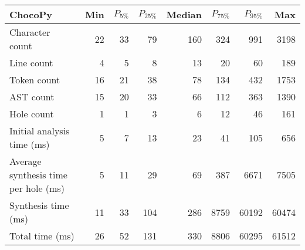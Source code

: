 \begin{tabular}{|l|r|r|r|r|r|r|r|}
  \hline
  ChocoPy & Min & $P_{5\%}$ & $P_{25\%}$ & Median & $P_{75\%}$ & $P_{95\%}$ & Max \\
  \hline
  \hline
  Character count & 22 & 33 & 79 & 160 & 324 & 991 & 3198 \\
  Line count & 4 & 5 & 8 & 13 & 20 & 60 & 189 \\
  Token count & 16 & 21 & 38 & 78 & 134 & 432 & 1753 \\
  AST count & 15 & 20 & 33 & 66 & 112 & 363 & 1390 \\
  Hole count & 1 & 1 & 3 & 6 & 12 & 46 & 161 \\
  \hline
  Initial analysis time (ms) & 5 & 7 & 13 & 23 & 41 & 105 & 656 \\
  Average synthesis time per hole (ms) & 5 & 11 & 29 & 69 & 387 & 6671 & 7505 \\
  Synthesis time (ms) & 11 & 33 & 104 & 286 & 8759 & 60192 & 60474 \\
  Total time (ms) & 26 & 52 & 131 & 330 & 8806 & 60295 & 61512 \\
  \hline
\end{tabular}